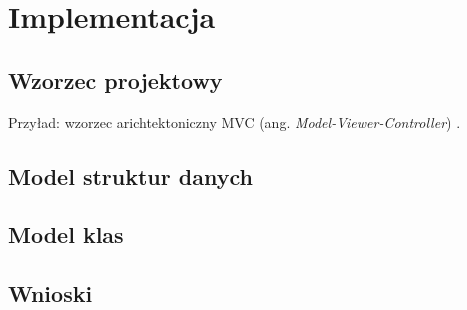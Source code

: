 \newpage\section{Implementacja} \label{sec:implementacja}
\subsection{Wzorzec projektowy}
%
Przyład: wzorzec arichtektoniczny MVC (ang. \textit{Model-Viewer-Controller}) \cite{mvc2017}.
\subsection{Model struktur danych}

\subsection{Model klas}
\subsection{Wnioski}
 
